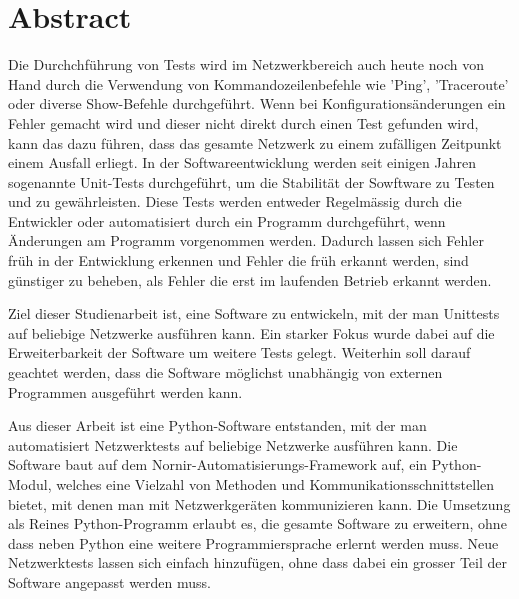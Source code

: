 \documentclass[]{subfiles}
\begin{document}
\section*{Abstract}
    Die Durchchführung von Tests wird im Netzwerkbereich auch heute noch von Hand durch die Verwendung
    von Kommandozeilenbefehle wie 'Ping', 'Traceroute' oder diverse Show-Befehle durchgeführt.
    Wenn bei Konfigurationsänderungen ein Fehler gemacht wird und dieser nicht direkt durch
    einen Test gefunden wird, kann das dazu führen, dass das gesamte Netzwerk zu einem 
    zufälligen Zeitpunkt einem Ausfall erliegt.
    In der Softwareentwicklung werden seit einigen Jahren sogenannte Unit-Tests durchgeführt,
    um die Stabilität der Sowftware zu Testen und zu gewährleisten.
    Diese Tests werden entweder Regelmässig durch die Entwickler oder automatisiert durch
    ein Programm durchgeführt, wenn Änderungen am Programm vorgenommen werden.
    Dadurch lassen sich Fehler früh in der Entwicklung erkennen und Fehler die früh erkannt 
    werden, sind günstiger zu beheben, als Fehler die erst im laufenden Betrieb erkannt werden.

    Ziel dieser Studienarbeit ist, eine Software zu entwickeln, mit der man Unittests
    auf beliebige Netzwerke ausführen kann. 
    Ein starker Fokus wurde dabei auf die Erweiterbarkeit der Software um weitere Tests gelegt.
    Weiterhin soll darauf geachtet werden, dass die Software möglichst unabhängig von externen
    Programmen ausgeführt werden kann.

    Aus dieser Arbeit ist eine Python-Software entstanden, mit der man automatisiert Netzwerktests
    auf beliebige Netzwerke ausführen kann.
    Die Software baut auf dem Nornir-Automatisierungs-Framework auf, ein Python-Modul, welches
    eine Vielzahl von Methoden und Kommunikationsschnittstellen bietet, 
    mit denen man mit Netzwerkgeräten kommunizieren kann.
    Die Umsetzung als Reines Python-Programm erlaubt es, die gesamte Software zu erweitern, 
    ohne dass neben Python eine weitere Programmiersprache erlernt werden muss.
    Neue Netzwerktests lassen sich einfach hinzufügen, ohne dass dabei ein grosser Teil der 
    Software angepasst werden muss.



    
\end{document}
